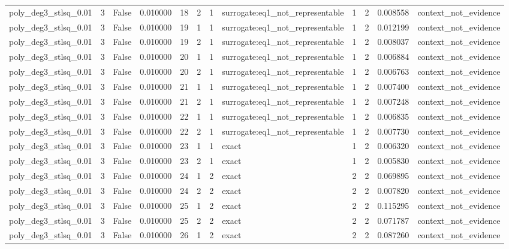 \begin{tabular}{lrrrrrrlrrrl}
poly\_deg3\_stlsq\_0.01 & 3 & False & 0.010000 & 18 & 2 & 1 & surrogate:eq1\_not\_representable & 1 & 2 & 0.008558 & context\_not\_evidence \\
poly\_deg3\_stlsq\_0.01 & 3 & False & 0.010000 & 19 & 1 & 1 & surrogate:eq1\_not\_representable & 1 & 2 & 0.012199 & context\_not\_evidence \\
poly\_deg3\_stlsq\_0.01 & 3 & False & 0.010000 & 19 & 2 & 1 & surrogate:eq1\_not\_representable & 1 & 2 & 0.008037 & context\_not\_evidence \\
poly\_deg3\_stlsq\_0.01 & 3 & False & 0.010000 & 20 & 1 & 1 & surrogate:eq1\_not\_representable & 1 & 2 & 0.006884 & context\_not\_evidence \\
poly\_deg3\_stlsq\_0.01 & 3 & False & 0.010000 & 20 & 2 & 1 & surrogate:eq1\_not\_representable & 1 & 2 & 0.006763 & context\_not\_evidence \\
poly\_deg3\_stlsq\_0.01 & 3 & False & 0.010000 & 21 & 1 & 1 & surrogate:eq1\_not\_representable & 1 & 2 & 0.007400 & context\_not\_evidence \\
poly\_deg3\_stlsq\_0.01 & 3 & False & 0.010000 & 21 & 2 & 1 & surrogate:eq1\_not\_representable & 1 & 2 & 0.007248 & context\_not\_evidence \\
poly\_deg3\_stlsq\_0.01 & 3 & False & 0.010000 & 22 & 1 & 1 & surrogate:eq1\_not\_representable & 1 & 2 & 0.006835 & context\_not\_evidence \\
poly\_deg3\_stlsq\_0.01 & 3 & False & 0.010000 & 22 & 2 & 1 & surrogate:eq1\_not\_representable & 1 & 2 & 0.007730 & context\_not\_evidence \\
poly\_deg3\_stlsq\_0.01 & 3 & False & 0.010000 & 23 & 1 & 1 & exact & 1 & 2 & 0.006320 & context\_not\_evidence \\
poly\_deg3\_stlsq\_0.01 & 3 & False & 0.010000 & 23 & 2 & 1 & exact & 1 & 2 & 0.005830 & context\_not\_evidence \\
poly\_deg3\_stlsq\_0.01 & 3 & False & 0.010000 & 24 & 1 & 2 & exact & 2 & 2 & 0.069895 & context\_not\_evidence \\
poly\_deg3\_stlsq\_0.01 & 3 & False & 0.010000 & 24 & 2 & 2 & exact & 2 & 2 & 0.007820 & context\_not\_evidence \\
poly\_deg3\_stlsq\_0.01 & 3 & False & 0.010000 & 25 & 1 & 2 & exact & 2 & 2 & 0.115295 & context\_not\_evidence \\
poly\_deg3\_stlsq\_0.01 & 3 & False & 0.010000 & 25 & 2 & 2 & exact & 2 & 2 & 0.071787 & context\_not\_evidence \\
poly\_deg3\_stlsq\_0.01 & 3 & False & 0.010000 & 26 & 1 & 2 & exact & 2 & 2 & 0.087260 & context\_not\_evidence \\

\end{tabular}
